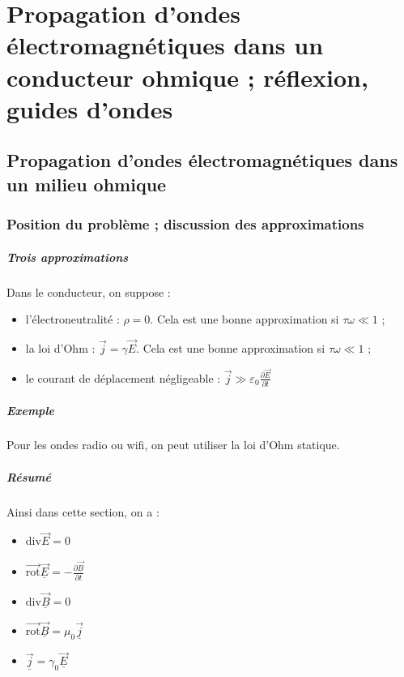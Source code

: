 \documentclass[french]{book}
\theoremstyle{plain}
\theoremstyle{definition}
\theoremstyle{remark}
\newcommand{\rot}{\overrightarrow{\text{rot}}}
\renewcommand{\div}{\text{div}}
\begin{document}
\chapter{Propagation d'ondes électromagnétiques dans un conducteur ohmique ; réflexion, guides d'ondes}
\localtableofcontents
\section{Propagation d'ondes électromagnétiques dans un milieu ohmique}
\subsection{Position du problème ; discussion des approximations}
\paragraph{Trois approximations} Dans le conducteur, on suppose :
\begin{itemize}
	\item l'électroneutralité : $\rho=0$. Cela est une bonne approximation si $\tau\omega\ll 1$ ;
	\item la loi d'Ohm : $\overrightarrow{j}=\gamma\overrightarrow{E}$. Cela est une bonne approximation si $\tau\omega\ll 1$ ;
	\item le courant de déplacement négligeable : $\displaystyle\overrightarrow{j}\gg\varepsilon_0\frac{\partial\overrightarrow{E}}{\partial t}$
\end{itemize}
\paragraph{Exemple}Pour les ondes radio ou wifi, on peut utiliser la loi d'Ohm statique.
\paragraph{Résumé} Ainsi dans cette section, on a : 
\begin{itemize}
	\item $\div\overrightarrow{E}=0$
	\item $\displaystyle\rot\underline{\overrightarrow{E}}=-\frac{\partial\underline{\overrightarrow{B}}}{\partial t}$
	\item $\div\underline{\overrightarrow{B}}=0$
	\item $\rot\underline{\overrightarrow{B}}=\mu_0\underline{\overrightarrow{j}}$
	\item $\underline{\overrightarrow{j}}=\gamma_0\underline{\overrightarrow{E}}$
\end{itemize}
\end{document}
